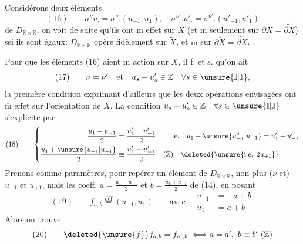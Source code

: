 Considérons deux éléments
\[
(16)\qquad \sigma^\nu u_\cdot=\sigma^\nu.(u_{-1},u_1),\quad\sigma^{\nu'}.u'_\cdot=\sigma^{\nu'}.(u'_{-1},u'_1)
\]
de $D_{\mathbb R\times\mathbb R}$, on voit de suite qu'ils ont $\overline{\mathrm m}$ effet sur $\widetilde X$  (et $\overline{\mathrm m}$ seulement sur $\partial\widetilde X=\widetilde{\partial X}$) ssi ils sont égaux: $D_{\mathbb R\times\mathbb R}$ opère \uline{fidèlement} sur $\widetilde X$, et $\overline{\mathrm m}$ sur $\partial\widetilde X=\widetilde{\partial X}$.

Pour que les éléments (16) aient $\overline{\mathrm m}$ action sur $X$, il f. et s. qu'on ait
\[
(17)\qquad \nu=\nu'\quad\text{et}\quad u_s-u'_s\in\mathbb Z\quad\forall s\in\unsure{\mathbb I|\mathbb J},
\]
la première condition  exprimant d'ailleurs que les deux opérations envisagées ont $\overline{\mathrm m}$ effet sur l'orientation de $X$. La condition $u_s-u'_s\in\mathbb Z\quad\forall s\in\unsure{\mathbb I|\mathbb J}$ s'explicite par
\[
(18)\qquad\left\{\begin{aligned}
\frac{u_1-u_{-1}}2&=\frac{u'_1-u'_{-1}}2\qquad\text{i.e.}\quad u_1-\unsure{u_{-1}^{4}|u_{-1}}=u'_1-u'_{-1}\\
\frac{u_1+\unsure{u_{+1}|u_{-1}}}2&\equiv\frac{u'_1+u'_{-1}}2\quad(\mathbb Z)\quad\deleted{\unsure{\text{i.e. }2u_{+1}}}
\end{aligned}\right.
\]
 Prenons comme paramètres, pour repérer un élément  de $D_{\mathbb R\times\mathbb R}$, non plus ($\nu$ et) $u_{-1}$ et $u_{+1}$, mais les coeff. $a=\frac{u_1-u_{-1}}2$ et $b=\frac{u_1+u_{-1}}2$ de (14), en posant
\[
(19)\qquad f_{a,b}\overset{\mathrm{déf}}{=}(u_{-1},u_1)\qquad\text{avec}\quad\begin{aligned}u_{-1}&=-a+b\\u_1&=a+b\end{aligned}
\]
Alors on trouve
\[
(20)\qquad\deleted{\unsure{f}}f_{a,b}=f_{a',b'}\Longleftrightarrow a=a',\ b\equiv b'\ (\mathbb Z)
\]
